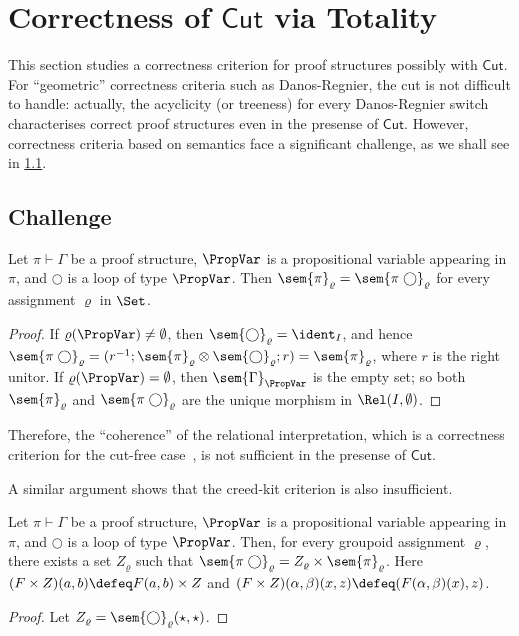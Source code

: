 \section{Correctness of $\mathsf{Cut}$ via Totality}\label{sec:cut}
This section studies a correctness criterion for proof structures possibly with \( \mathsf{Cut} \).
For ``geometric'' correctness criteria such as Danos-Regnier, the cut is not difficult to handle: actually, the acyclicity (or treeness) for every Danos-Regnier switch characterises correct proof structures even in the presense of \( \mathsf{Cut} \).
However, correctness criteria based on semantics face a significant challenge, as we shall see in \cref{sec:cut:challenge}.

\subsection{Challenge}
\label{sec:cut:challenge}


\begin{proposition}
    Let \( \pi \vdash \Gamma \) be a proof structure, \( \PropVar \) is a propositional variable appearing in \( \pi \), and \( \bigcirc \) is a loop of type \( \PropVar \).
    Then \( \sem{\pi}_\varrho = \sem{\pi\;\bigcirc}_\varrho \) for every assignment \( \varrho \) in \( \Set \).
\end{proposition}
\begin{proof}
    If \( \varrho(\PropVar) \neq \emptyset \), then \( \sem{\bigcirc}_{\varrho} = \ident_I \), and hence \( \sem{\pi\;\bigcirc}_{\varrho} = (r^{-1};\sem{\pi}_\varrho \otimes \sem{\bigcirc}_{\varrho}; r) = \sem{\pi}_{\varrho} \), where \( r \) is the right unitor.
    If \( \varrho(\PropVar) = \emptyset \), then \( \sem{\Gamma}_{\PropVar} \) is the empty set; so both \( \sem{\pi}_\varrho \) and \( \sem{\pi\;\bigcirc}_\varrho \) are the unique morphism in \( \Rel(I, \emptyset) \).
\end{proof}
Therefore, the ``coherence'' of the relational interpretation, which is a correctness criterion for the cut-free case~\cite{coherence}, is not sufficient in the presense of \( \mathsf{Cut} \).

A similar argument shows that the creed-kit criterion is also insufficient.
\begin{proposition}\label{prop:cut:loop-in-profunctor}
    Let \( \pi \vdash \Gamma \) be a proof structure, \( \PropVar \) is a propositional variable appearing in \( \pi \), and \( \bigcirc \) is a loop of type \( \PropVar \).
    Then, for every groupoid assignment \( \varrho \), there exists a set \( Z_\varrho \) such that \( \sem{\pi\;\bigcirc}_\varrho = Z_{\varrho} \times \sem{\pi}_\varrho \).
    Here \( (F \times Z)(a,b) \defeq F(a,b) \times Z \) and \( (F \times Z)(\alpha, \beta)(x,z) \defeq (F(\alpha,\beta)(x), z) \).
\end{proposition}
\begin{proof}
    Let \( Z_\varrho = \sem{\bigcirc}_{\varrho}(\star, \star) \).
\end{proof}

